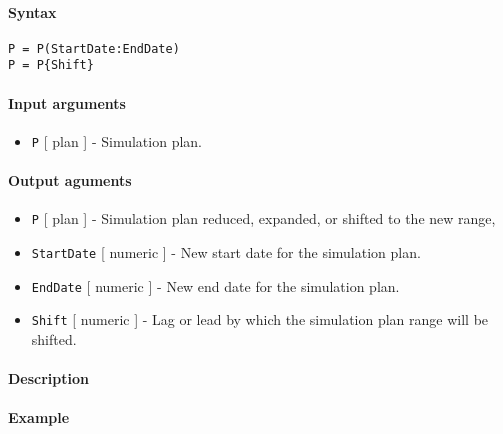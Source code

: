 


	\paragraph{Syntax}\label{syntax}

\begin{verbatim}
P = P(StartDate:EndDate)
P = P{Shift}
\end{verbatim}

\paragraph{Input arguments}\label{input-arguments}

\begin{itemize}
\itemsep1pt\parskip0pt
\item
  \texttt{P} {[} plan {]} - Simulation plan.
\end{itemize}

\paragraph{Output aguments}\label{output-aguments}

\begin{itemize}
\item
  \texttt{P} {[} plan {]} - Simulation plan reduced, expanded, or
  shifted to the new range,
\item
  \texttt{StartDate} {[} numeric {]} - New start date for the simulation
  plan.
\item
  \texttt{EndDate} {[} numeric {]} - New end date for the simulation
  plan.
\item
  \texttt{Shift} {[} numeric {]} - Lag or lead by which the simulation
  plan range will be shifted.
\end{itemize}

\paragraph{Description}\label{description}

\paragraph{Example}\label{example}


